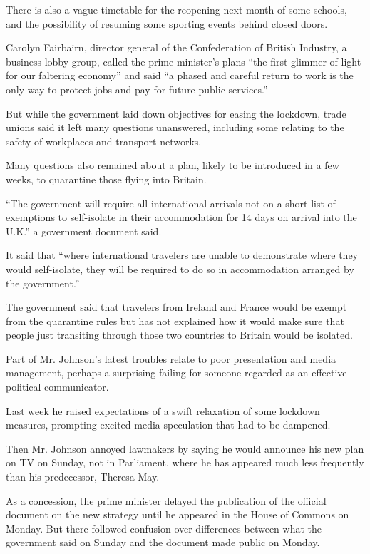 There is also a vague timetable for the reopening next month of some
schools, and the possibility of resuming some sporting events behind
closed doors.

Carolyn Fairbairn, director general of the Confederation of British
Industry, a business lobby group, called the prime minister's plans
``the first glimmer of light for our faltering economy'' and said ``a
phased and careful return to work is the only way to protect jobs and
pay for future public services.''

But while the government laid down objectives for easing the lockdown,
trade unions said it left many questions unanswered, including some
relating to the safety of workplaces and transport networks.

Many questions also remained about a plan, likely to be introduced in a
few weeks, to quarantine those flying into Britain.

``The government will require all international arrivals not on a short
list of exemptions to self-isolate in their accommodation for 14 days on
arrival into the U.K.'' a government document said.

It said that ``where international travelers are unable to demonstrate
where they would self-isolate, they will be required to do so in
accommodation arranged by the government.''

The government said that travelers from Ireland and France would be
exempt from the quarantine rules but has not explained how it would make
sure that people just transiting through those two countries to Britain
would be isolated.

Part of Mr. Johnson's latest troubles relate to poor presentation and
media management, perhaps a surprising failing for someone regarded as
an effective political communicator.

Last week he raised expectations of a swift relaxation of some lockdown
measures, prompting excited media speculation that had to be dampened.

Then Mr. Johnson annoyed lawmakers by saying he would announce his new
plan on TV on Sunday, not in Parliament, where he has appeared much less
frequently than his predecessor, Theresa May.

As a concession, the prime minister delayed the publication of the
official document on the new strategy until he appeared in the House of
Commons on Monday. But there followed confusion over differences between
what the government said on Sunday and the document made public on
Monday.

